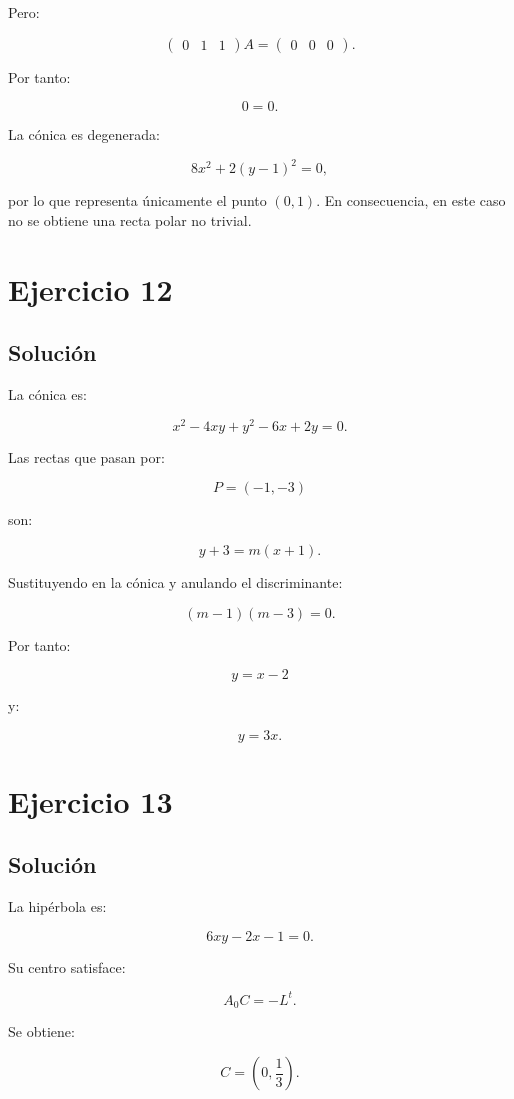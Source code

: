 \documentclass[11pt,a4paper]{article}
\begin{document}
Pero:

\[
\begin{pmatrix}
0&1&1
\end{pmatrix}
A
=
\begin{pmatrix}
0&0&0
\end{pmatrix}.
\]

Por tanto:

\[
\boxed{
0=0.
}
\]

La cónica es degenerada:

\[
8x^2+2(y-1)^2=0,
\]

por lo que representa únicamente el punto \((0,1)\). En consecuencia, en este caso no se obtiene una recta polar no trivial.

\section{Ejercicio 12}
\subsection{Solución}

La cónica es:

\[
x^2-4xy+y^2-6x+2y=0.
\]

Las rectas que pasan por:

\[
P=(-1,-3)
\]

son:

\[
y+3=m(x+1).
\]

Sustituyendo en la cónica y anulando el discriminante:

\[
(m-1)(m-3)=0.
\]

Por tanto:

\[
\boxed{
y=x-2
}
\]

y:

\[
\boxed{
y=3x.
}
\]

\section{Ejercicio 13}
\subsection{Solución}

La hipérbola es:

\[
6xy-2x-1=0.
\]

Su centro satisface:

\[
A_0C=-L^t.
\]

Se obtiene:

\[
\boxed{
C=
\left(
0,\frac13
\right).
}
\]
\end{document}
